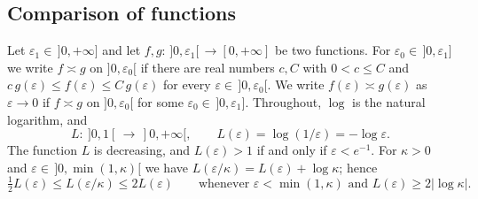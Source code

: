 \documentclass[11pt,a4paper]{article}
\theoremstyle{definition}
\theoremstyle{remark}
\numberwithin{equation}{section}
\newcommand{\abs}[1]{\lvert #1\rvert}
\newcommand{\eps}{\varepsilon}
\begin{document}
\subsection{Comparison of functions}\label{sec:comparison}
Let $\eps_1\in\,]0,+\infty]$ and let $f,g:\,]0,\eps_1[\,\to[0,+\infty]$ be two functions. For $\eps_0\in\,]0,\eps_1]$ we write $f\asymp g$ on $]0,\eps_0[$ if there are real numbers $c,C$ with $0<c\le C$ and $c\,g(\eps)\le f(\eps)\le C\,g(\eps)$ for every $\eps\in\,]0,\eps_0[$. We write $f(\eps)\asymp g(\eps)$ as $\eps\to0$ if $f\asymp g$ on $]0,\eps_0[$ for some $\eps_0\in\,]0,\eps_1]$. Throughout, $\log$ is the natural logarithm, and
\begin{equation}\label{eq:L}
L:\ ]0,1[\,\to\,]0,+\infty[,\qquad L(\eps)=\log(1/\eps)=-\log\eps .
\end{equation}
The function $L$ is decreasing, and $L(\eps)>1$ if and only if $\eps<e^{-1}$. For $\kappa>0$ and $\eps\in\,]0,\min(1,\kappa)[$ we have $L(\eps/\kappa)=L(\eps)+\log\kappa$; hence
\begin{equation}\label{eq:L-shift}
\tfrac12L(\eps)\le L(\eps/\kappa)\le2L(\eps)\qquad\text{whenever }\eps<\min(1,\kappa)\text{ and }L(\eps)\ge2\abs{\log\kappa}.
\end{equation}
\end{document}
